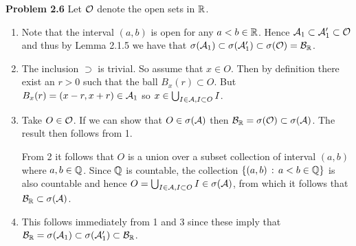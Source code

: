 \documentclass{lecturenotes}
\begin{document}
\textbf{Problem 2.6}
Let $\mathcal O$ denote the open sets in $\mathbb R$.
\begin{enumerate}[label=(\alph*)]
\item Note that the interval $(a,b)$ is open for any $a < b \in \mathbb R$. Hence $\mathcal A_1 \subset \mathcal A_1^\prime \subset \mathcal O$ and thus by Lemma 2.1.5 we have that $\sigma(\mathcal A_1) \subset \sigma(\mathcal A_1^\prime) \subset \sigma(\mathcal O) = \mathcal B_{\mathbb R}$.
\item The inclusion $\supset$ is trivial. So assume that $x \in O$. Then by definition there exist an $r > 0$ such that the ball $B_x(r) \subset O$. But $B_x(r) = (x-r, x+r) \in \mathcal A_1$ so $x \in \bigcup_{I \in \mathcal A, I \subset O} I$.
\item Take $O \in \mathcal O$. If we can show that $O \in \sigma(\mathcal A)$ then $\mathcal B_{\mathbb R} = \sigma(\mathcal O) \subset \sigma(\mathcal A)$. The result then follows from 1. 

From 2 it follows that $O$ is a union over a subset collection of interval $(a,b)$ where $a,b \in \mathbb Q$. Since $\mathbb Q$ is countable, the collection $\{(a,b) \, : \, a < b \in \mathbb Q\}$ is also countable and hence $O = \bigcup_{I \in \mathcal A, I \subset O} I \in \sigma(\mathcal A)$, from which it follows that $\mathcal B_{\mathbb R} \subset \sigma(\mathcal A)$.
\item This follows immediately from 1 and 3 since these imply that $\mathcal B_{\mathbb R} = \sigma(\mathcal A_1) \subset \sigma(\mathcal A_1^\prime) \subset \mathcal B_{\mathbb R}$.
\end{enumerate}

\bigskip
\end{document}
